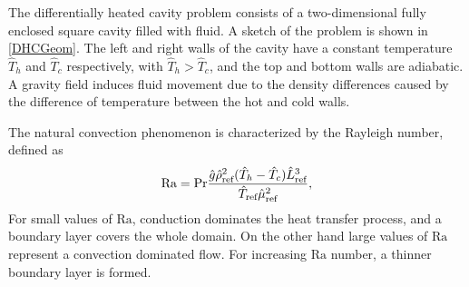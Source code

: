 {The differentially heated cavity problem consists of a two-dimensional fully enclosed square cavity filled with fluid.  A sketch of the problem is shown in \cref{DHCGeom}. The left and right walls of the cavity have a constant temperature $\hat{T}_h$ and $\hat{T}_c$ respectively, with $\hat{T}_h >\hat{T}_c$, and the top and bottom walls are adiabatic. A gravity field induces fluid movement due to the density differences caused by the difference of temperature between the hot and cold walls.

The natural convection phenomenon is characterized by the Rayleigh number, defined as 
\begin{equation}\label{eq:Rayleigh}
\text{Ra} = \text{Pr} \frac{\hat g \hat \rho_{\text{ref}}^2(\hat T_h-\hat T_c) \hat L_{\text{ref}}^3}{\hat T_{\text{ref}}\hat \mu_{\text{ref}}^2},
\end{equation}
For small values of $\text{Ra}$, conduction dominates the heat transfer process, and a boundary layer covers the whole domain. On the other hand large values of $\text{Ra}$ represent a convection dominated flow. For increasing $\text{Ra}$ number, a thinner boundary layer is formed. 

}
